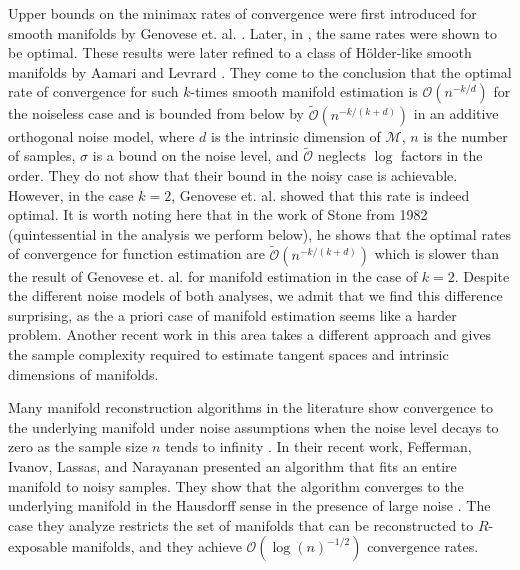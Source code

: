 \documentclass[12pt]{article}
\theoremstyle{remark}
\newcommand{\MM}{\mathcal{M}}
\newcommand{\wtilde}[1]{\widetilde{#1}}
\begin{document}
Upper bounds on the minimax rates of convergence were first introduced for smooth manifolds by Genovese et. al. \cite{genovese2012minimax,genovese2012manifold}. Later, in \cite{kim2015tight}, the same rates were shown to be optimal.
These results were later refined to a class of H\"older-like smooth manifolds by Aamari and Levrard \cite{aamari2019nonasymptotic}.
They come to the conclusion that the optimal rate of convergence for such $k$-times smooth manifold estimation is $\mathcal O(n^{-k/d})$ for the noiseless case and is bounded from below by $\wtilde{\mathcal{O}}(n^{-k/(k+d)})$ in an additive orthogonal noise model, where $d$ is the intrinsic dimension of $\MM$, $n$ is the number of samples, $\sigma$ is a bound on the noise level, and $\wtilde{\mathcal{O}}$ neglects $\log$ factors in the order.
They do not show that their bound in the noisy case is achievable. 
However, in the case $k=2$, Genovese et. al. showed that this rate is indeed optimal.
It is worth noting here that in the work of Stone from 1982 \cite{stone1982optimal} (quintessential in the analysis we perform below), he shows that the optimal rates of convergence for function estimation are $\wtilde{\mathcal O}(n^{-k/(k+d)})$  which is slower than the result of Genovese et. al. for manifold estimation in the case of $k=2$.
Despite the different noise models of both analyses, we admit that we find this difference surprising, as the a priori case of manifold estimation seems like a harder problem.
Another recent work in this area \cite{lim2021tangent} takes a different approach and gives the sample complexity required to estimate tangent spaces and intrinsic dimensions of manifolds.

Many manifold reconstruction algorithms in the literature show convergence to the underlying manifold under noise assumptions when the noise level decays to zero as the sample size $n$ tends to infinity \cite{aamari2019nonasymptotic,puchkin2022structure}. 
In their recent work, Fefferman, Ivanov, Lassas, and Narayanan presented an algorithm that fits an entire manifold to noisy samples.
They show that the algorithm converges to the underlying manifold in the Hausdorff sense in the presence of large noise \cite{fefferman2023fitting}.
The case they analyze restricts the set of manifolds that can be reconstructed to $R$-exposable manifolds, and they achieve $\mathcal{O}(\log(n)^{-1/2})$ convergence rates.
\end{document}
